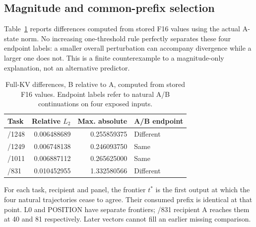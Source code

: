 \subsection{Magnitude and common-prefix selection}
Table~\ref{tab:statenorm} reports differences computed from stored F16 values using the actual A-state norm. No increasing one-threshold rule perfectly separates these four endpoint labels: a smaller overall perturbation can accompany divergence while a larger one does not. This is a finite counterexample to a magnitude-only explanation, not an alternative predictor.
\begin{table}[t]\centering\small
\caption{Full-KV differences, B relative to A, computed from stored F16 values. Endpoint labels refer to natural A/B continuations on four exposed inputs.}
\label{tab:statenorm}
\begin{tabular}{@{}lrrl@{}}\toprule
Task & Relative $L_2$ & Max. absolute & A/B endpoint\\\midrule
/1248 &0.006488689&0.255859375&Different\\
/1249 &0.006748138&0.246093750&Same\\
/1011 &0.006887112&0.265625000&Same\\
/831  &0.010452955&1.332580566&Different\\\bottomrule
\end{tabular}
\end{table}
For each task, recipient and panel, the frontier $t^*$ is the first output at which the four natural trajectories cease to agree. Their consumed prefix is identical at that point. L0 and POSITION have separate frontiers; /831 recipient A reaches them at 40 and 81 respectively. Later vectors cannot fill an earlier missing comparison.

